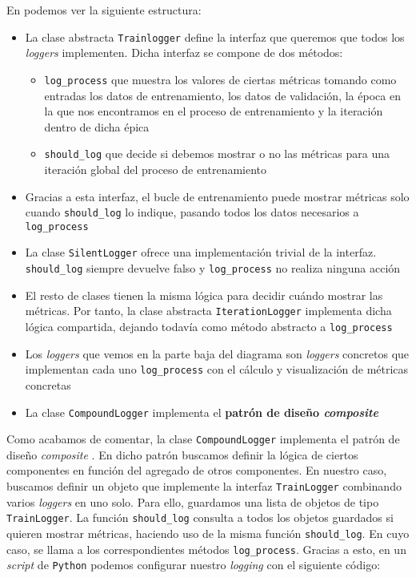 En  podemos ver la siguiente estructura:

\begin{itemize}
    \item La clase abstracta \lstinline{Trainlogger} define la interfaz que queremos que todos los \textit{loggers} implementen. Dicha interfaz se compone de dos métodos:
        \begin{itemize}
            \item \lstinline{log_process} que muestra los valores de ciertas métricas tomando como entradas los datos de entrenamiento, los datos de validación, la época en la que nos encontramos en el proceso de entrenamiento y la iteración dentro de dicha épica
            \item \lstinline{should_log} que decide si debemos mostrar o no las métricas para una iteración global del proceso de entrenamiento
        \end{itemize}
    \item Gracias a esta interfaz, el bucle de entrenamiento puede mostrar métricas solo cuando \lstinline{should_log} lo indique, pasando todos los datos necesarios a \lstinline{log_process}
    \item La clase \lstinline{SilentLogger} ofrece una implementación trivial de la interfaz. \lstinline{should_log} siempre devuelve falso y \lstinline{log_process} no realiza ninguna acción
    \item El resto de clases tienen la misma lógica para decidir cuándo mostrar las métricas. Por tanto, la clase abstracta \lstinline{IterationLogger} implementa dicha lógica compartida, dejando todavía como método abstracto a \lstinline{log_process}
    \item Los \textit{loggers} que vemos en la parte baja del diagrama son \textit{loggers} concretos que implementan cada uno \lstinline{log_process} con el cálculo y visualización de métricas concretas
    \item La clase \lstinline{CompoundLogger} implementa el \textbf{patrón de diseño \textit{composite}}
\end{itemize}

Como acabamos de comentar, la clase \lstinline{CompoundLogger} implementa el patrón de diseño \textit{composite} \cite{informatica:design_patterns}. En dicho patrón buscamos definir la lógica de ciertos componentes en función del agregado de otros componentes. En nuestro caso, buscamos definir un objeto que implemente la interfaz \lstinline{TrainLogger} combinando varios \textit{loggers} en uno solo. Para ello, guardamos una lista de objetos de tipo \lstinline{TrainLogger}. La función \lstinline{should_log} consulta a todos los objetos guardados si quieren mostrar métricas, haciendo uso de la misma función \lstinline{should_log}. En cuyo caso, se llama a los correspondientes métodos \lstinline{log_process}. Gracias a esto, en un \textit{script} de \lstinline{Python} podemos configurar nuestro \textit{logging} con el siguiente código:

